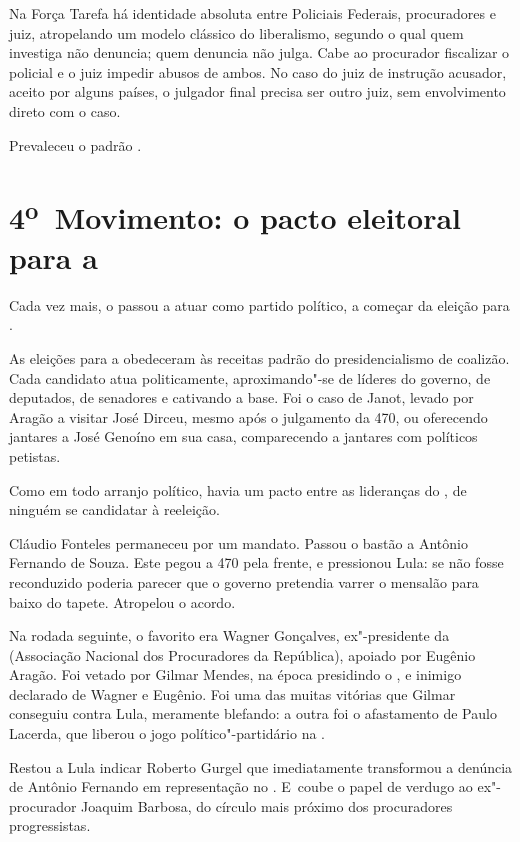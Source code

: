 Na Força Tarefa há identidade absoluta entre Policiais Federais,
procuradores e juiz, atropelando um modelo clássico do liberalismo,
segundo o qual quem investiga não denuncia; quem denuncia não julga.
Cabe ao procurador fiscalizar o policial e o juiz impedir abusos de
ambos. No caso do juiz de instrução acusador, aceito por alguns países,
o julgador final precisa ser outro juiz, sem envolvimento direto com o
caso.

Prevaleceu o padrão .

\section{4\textsuperscript{o}~Movimento: o pacto eleitoral para a }

Cada vez mais, o  passou a atuar como partido político, a começar da
eleição para .

As eleições para a  obedeceram às receitas padrão do presidencialismo
de coalizão. Cada candidato atua politicamente, aproximando"-se de
líderes do governo, de deputados, de senadores e cativando a base. Foi o
caso de Janot, levado por Aragão a visitar José Dirceu, mesmo após o
julgamento da  470, ou oferecendo jantares a José Genoíno em sua casa,
comparecendo a jantares com políticos petistas.

Como em todo arranjo político, havia um pacto entre as lideranças do
, de ninguém se candidatar à reeleição.

Cláudio Fonteles permaneceu  por um mandato. Passou o bastão a
Antônio Fernando de Souza. Este pegou a  470 pela frente, e pressionou
Lula: se não fosse reconduzido poderia parecer que o governo pretendia
varrer o mensalão para baixo do tapete. Atropelou o acordo.

Na rodada seguinte, o favorito era Wagner Gonçalves, ex"-presidente da
 (Associação Nacional dos Procuradores da República), apoiado por
Eugênio Aragão. Foi vetado por Gilmar Mendes, na época presidindo o ,
e inimigo declarado de Wagner e Eugênio. Foi uma das muitas vitórias que
Gilmar conseguiu contra Lula, meramente blefando: a outra foi o
afastamento de Paulo Lacerda, que liberou o jogo político"-partidário na
.

Restou a Lula indicar Roberto Gurgel que imediatamente transformou a
denúncia de Antônio Fernando em representação no . E~coube o papel de
verdugo ao ex"-procurador Joaquim Barbosa, do círculo mais próximo dos
procuradores progressistas.

